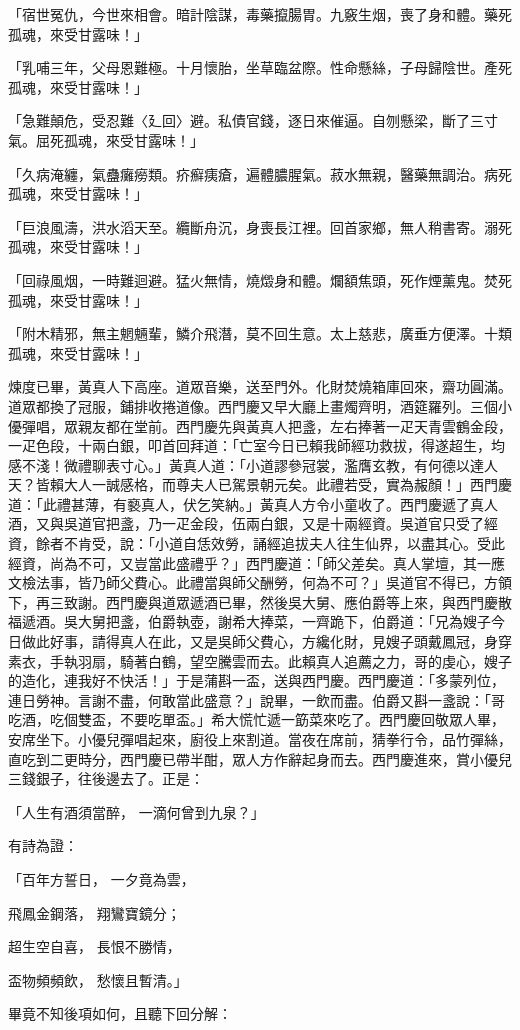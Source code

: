 「宿世冤仇，今世來相會。暗計陰謀，毒藥攛腸胃。九竅生烟，喪了身和體。藥死孤魂，來受甘露味！」

「乳哺三年，父母恩難極。十月懷胎，坐草臨盆際。性命懸絲，子母歸陰世。產死孤魂，來受甘露味！」

「急難顛危，受忍難〈廴回〉避。私債官錢，逐日來催逼。自刎懸梁，斷了三寸氣。屈死孤魂，來受甘露味！」

「久病淹纏，氣蠱癱癆類。疥癬痍瘡，遍體膿腥氣。菽水無親，醫藥無調治。病死孤魂，來受甘露味！」

「巨浪風濤，洪水滔天至。纜斷舟沉，身喪長江裡。回首家鄉，無人稍書寄。溺死孤魂，來受甘露味！」

「回祿風烟，一時難迴避。猛火無情，燒燬身和體。爛額焦頭，死作煙薰鬼。焚死孤魂，來受甘露味！」

「附木精邪，無主魍魎輩，鱗介飛潛，莫不回生意。太上慈悲，廣垂方便澤。十類孤魂，來受甘露味！」

煉度已畢，黃真人下高座。道眾音樂，送至門外。化財焚燒箱庫回來，齋功圓滿。道眾都換了冠服，鋪排收捲道像。西門慶又早大廳上畫燭齊明，酒筵羅列。三個小優彈唱，眾親友都在堂前。西門慶先與黃真人把盞，左右捧著一疋天青雲鶴金段，一疋色段，十兩白銀，叩首回拜道：「亡室今日已賴我師經功救拔，得遂超生，均感不淺！微禮聊表寸心。」黃真人道：「小道謬參冠裳，濫膺玄教，有何德以達人天？皆賴大人一誠感格，而尊夫人已駕景朝元矣。此禮若受，實為赧顏！」西門慶道：「此禮甚薄，有褻真人，伏乞笑納。」黃真人方令小童收了。西門慶遞了真人酒，又與吳道官把盞，乃一疋金段，伍兩白銀，又是十兩經資。吳道官只受了經資，餘者不肯受，說：「小道自恁效勞，誦經追拔夫人往生仙界，以盡其心。受此經資，尚為不可，又豈當此盛禮乎？」西門慶道：「師父差矣。真人掌壇，其一應文檢法事，皆乃師父費心。此禮當與師父酬勞，何為不可？」吳道官不得已，方領下，再三致謝。西門慶與道眾遞酒已畢，然後吳大舅、應伯爵等上來，與西門慶散福遞酒。吳大舅把盞，伯爵執壺，謝希大捧菜，一齊跪下，伯爵道：「兄為嫂子今日做此好事，請得真人在此，又是吳師父費心，方纔化財，見嫂子頭戴鳳冠，身穿素衣，手執羽扇，騎著白鶴，望空騰雲而去。此賴真人追薦之力，哥的虔心，嫂子的造化，連我好不快活！」于是蒲斟一盃，送與西門慶。西門慶道：「多蒙列位，連日勞神。言謝不盡，何敢當此盛意？」說畢，一飲而盡。伯爵又斟一盞說：「哥吃酒，吃個雙盃，不要吃單盃。」希大慌忙遞一筯菜來吃了。西門慶回敬眾人畢，安席坐下。小優兒彈唱起來，廚役上來割道。當夜在席前，猜拳行令，品竹彈絲，直吃到二更時分，西門慶已帶半酣，眾人方作辭起身而去。西門慶進來，賞小優兒三錢銀子，往後邊去了。正是：

「人生有酒須當醉，  一滴何曾到九泉？」

有詩為證：

「百年方誓日，  一夕竟為雲，

飛鳳金鋼落，  翔鸞寶鏡分；

超生空自喜，  長恨不勝情，

盃物頻頻飲，  愁懷且暫清。」

畢竟不知後項如何，且聽下回分解：
